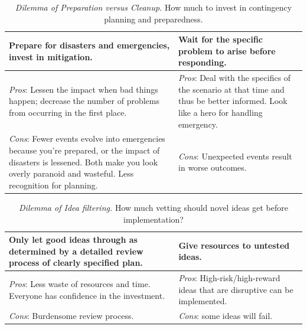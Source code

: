 \begin{center}
\begin{table}[H] %
\begin{tabular}{ | m{\dilemmatablewidth}| m{\dilemmatablewidth} | } 
  \hline
  \textbf{Prepare for disasters and emergencies, invest in mitigation.} &
  \textbf{Wait for the specific problem to arise before responding.} \\
  \hline
  \textit{Pros}: Lessen the impact when bad things happen; decrease the number of problems from occurring in the first place. &
  \textit{Pros}: Deal with the specifics of the scenario at that time and thus be better informed. Look like a hero for handling emergency. \\
  \hline
  \textit{Cons}: Fewer events evolve into emergencies because you're prepared, or the impact of disasters is lessened. Both make you look overly paranoid and wasteful. Less recognition for planning. & 
  \textit{Cons}: Unexpected events result in worse outcomes.  \\
  \hline
\end{tabular}
\caption{\textit{Dilemma of Preparation versus Cleanup.} How much to invest in contingency planning and preparedness.}
\label{table:emergencies-vs-ignore}
\end{table}
\end{center}



\begin{center}
\begin{table}[H] %
\begin{tabular}{ | m{\dilemmatablewidth}| m{\dilemmatablewidth} | } 
  \hline
  \textbf{Only let good ideas through as determined by a detailed review process of clearly specified plan.} &
  \textbf{Give resources to untested ideas.} \\
  \hline
  \textit{Pros}: Less waste of resources and time. Everyone has confidence in the investment. & 
  \textit{Pros}: High-risk/high-reward ideas that are disruptive can be implemented. \\
  \hline
  \textit{Cons}: Burdensome review process. & 
  \textit{Cons}: some ideas will fail. \\
  \hline
\end{tabular}
\caption{\textit{Dilemma of Idea filtering.}
How much vetting should novel ideas get before implementation?
}
\label{table:idea-filtering}
\end{table}
\end{center}




